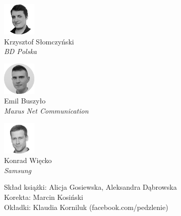 \begin{minipage}[t]{0.33\textwidth}
	\center     
    \includegraphics[width=60px]{img/people/czarno_biale/krzysztof-crop.png}   \\
    Krzysztof Słomczyński \\
    	\textit{BD Polska}
\end{minipage}
\begin{minipage}[t]{0.33\textwidth}
	\center 
    \includegraphics[width=60px]{img/people/czarno_biale/emilb.png}    \\
    Emil Buszyło \\
	\textit{Maxus Net Communication}  
\end{minipage}
\begin{minipage}[t]{0.33\textwidth}
	\center     
    \includegraphics[width=60px]{img/people/czarno_biale/konrad-crop.png}   \\
    Konrad Więcko \\
	\textit{Samsung}
\end{minipage}

\newpage
Skład książki: Alicja Gosiewska, Aleksandra Dąbrowska \\
Korekta: Marcin Kosiński \\
Okładki: Klaudia Korniluk (facebook.com/pedzlenie) \\